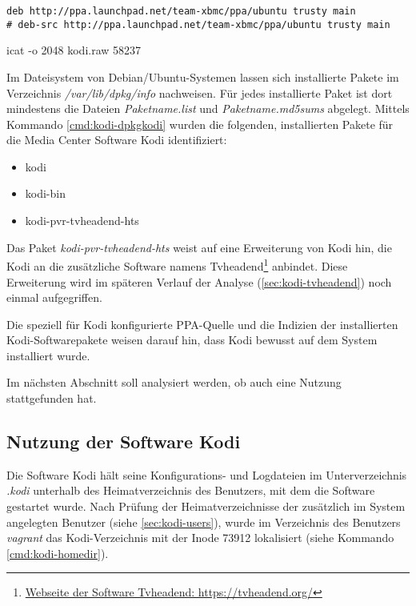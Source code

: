 \begin{cmd}[H]
\begin{verbatim}
deb http://ppa.launchpad.net/team-xbmc/ppa/ubuntu trusty main
# deb-src http://ppa.launchpad.net/team-xbmc/ppa/ubuntu trusty main
\end{verbatim}
\caption{icat -o 2048 kodi.raw 58237}
\label{cmd:kodi-ppaxbmc}
\end{cmd}

Im Dateisystem von Debian/Ubuntu-Systemen lassen sich installierte Pakete im Verzeichnis \textit{/var/lib/dpkg/info} nachweisen. Für jedes installierte Paket ist dort mindestens die Dateien \textit{Paketname.list} und \textit{Paketname.md5sums} abgelegt. Mittels Kommando \autoref{cmd:kodi-dpkgkodi} wurden die folgenden, installierten Pakete für die Media Center Software Kodi identifiziert:

\begin{itemize}
\item kodi
\item kodi-bin
\item kodi-pvr-tvheadend-hts
\end{itemize}

\label{sec-kodi-tvheadend-hts}
Das Paket \textit{kodi-pvr-tvheadend-hts} weist auf eine Erweiterung von Kodi hin, die Kodi an die zusätzliche Software namens Tvheadend\footnote{\href{https://tvheadend.org/}{Webseite der Software Tvheadend: https://tvheadend.org/}} anbindet. Diese Erweiterung wird im späteren Verlauf der Analyse (\autoref{sec:kodi-tvheadend}) noch einmal aufgegriffen.

Die speziell für Kodi konfigurierte PPA-Quelle und die Indizien der installierten Kodi-Softwarepakete weisen darauf hin, dass Kodi bewusst auf dem System installiert wurde. 

Im nächsten Abschnitt soll analysiert werden, ob auch eine Nutzung stattgefunden hat.

\subsection{Nutzung der Software Kodi}

Die Software Kodi hält seine Konfigurations- und Logdateien im Unterverzeichnis \textit{.kodi} unterhalb des Heimatverzeichnis des Benutzers, mit dem die Software gestartet wurde. Nach Prüfung der Heimatverzeichnisse der zusätzlich im System angelegten Benutzer (siehe \autoref{sec:kodi-users}), wurde im Verzeichnis des Benutzers \textit{vagrant} das Kodi-Verzeichnis mit der Inode 73912 lokalisiert (siehe Kommando \autoref{cmd:kodi-homedir}).

